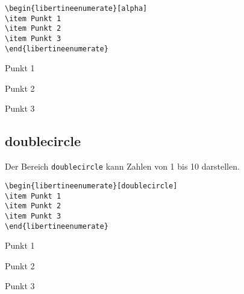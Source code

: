\documentclass[ngerman]{libertinedoku}
\begin{document}
\begin{minipage}{\linewidth}
\begin{minipage}{.48\linewidth}
\begin{lstlisting}
\begin{libertineenumerate}[alpha]
\item Punkt 1
\item Punkt 2
\item Punkt 3
\end{libertineenumerate}
\end{lstlisting}
\end{minipage}\hfill
\begin{minipage}{.48\linewidth}
\begin{libertineenumerate}[alpha]
\item Punkt 1
\item Punkt 2
\item Punkt 3
\end{libertineenumerate}
\end{minipage}
\end{minipage}

\subsection{doublecircle}

Der Bereich \texttt{doublecircle} kann Zahlen von 1 bis 10 darstellen.



\begin{minipage}{\linewidth}
\begin{minipage}{.48\linewidth}
\begin{lstlisting}
\begin{libertineenumerate}[doublecircle]
\item Punkt 1
\item Punkt 2
\item Punkt 3
\end{libertineenumerate}
\end{lstlisting}
\end{minipage}\hfill
\begin{minipage}{.48\linewidth}
\begin{libertineenumerate}[doublecircle]
\item Punkt 1
\item Punkt 2
\item Punkt 3
\end{libertineenumerate}
\end{minipage}
\end{minipage}
\end{document}
